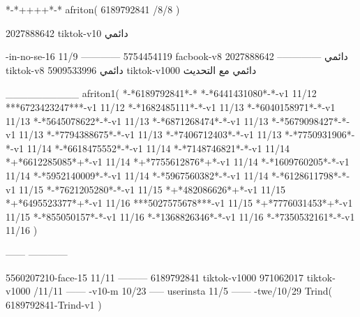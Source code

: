 *-*++++*-*
afriton(
6189792841 /8/8
)

2027888642 tiktok-v10
دائمي

-in-no-se-16 11/9
------------
5754454119 facbook-v8
دائمي
--------------
2027888642 tiktok-v8
دائمي
5909533996 tiktok-v1000
دائمي مع التحديث

__________
afriton1(
*-*6189792841*-*
*-*6441431080*-*-v1 11/12
***6723423247***-v1 11/12
*-*1682485111*-*-v1 11/13
*-*6040158971*-*-v1 11/13
*-*5645078622*-*-v1 11/13
*-*6871268474*-*-v1 11/13
*-*5679098427*-*-v1 11/13
*-*7794388675*-*-v1 11/13
*-*7406712403*-*-v1 11/13
*-*7750931906*-*-v1 11/14
*-*6618475552*-*-v1 11/14
*-*7148746821*-*-v1 11/14
*+*6612285085*+*-v1 11/14
*+*7755612876*+*-v1 11/14
*-*1609760205*-*-v1 11/14
*-*5952140009*-*-v1 11/14
*-*5967560382*-*-v1 11/14
*-*6128611798*-*-v1 11/15
*-*7621205280*-*-v1 11/15
*+*482086626*+*-v1 11/15
*+*6495523377*+*-v1 11/16
***5027575678***-v1 11/15
*+*7776031453*+*-v1 11/15
*-*855050157*-*-v1 11/16
*-*1368826346*-*-v1 11/16
*-*7350532161*-*-v1 11/16
)

------
------------

5560207210-face-15 11/11
---------
6189792841 tiktok-v1000
971062017 tiktok-v1000 /11/11
------
-v10-m 10/23
-----
userinsta 11/5
------
-twe/10/29
Trind(
6189792841-Trind-v1 
)
